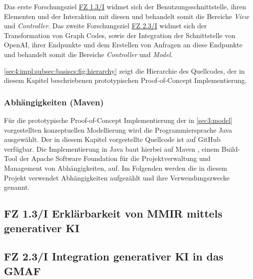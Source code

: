 Das erste Forschungsziel \hyperref[sec4:impl:subsec:fz-explainability]{FZ 1.3/I} widmet sich der Benutzungsschnittstelle, ihren Elementen und der Interaktion mit diesen und behandelt somit die Bereiche \textit{View} und \textit{Controller}.
Das zweite Forschungsziel \hyperref[sec4:impl:subsec:fz-integration]{FZ 2.3/I} widmet sich der Transformation von Graph Codes, sowie der Integration der Schnittstelle von OpenAI, ihrer Endpunkte und dem Erstellen von Anfragen an diese Endpunkte und behandelt somit die Bereiche \textit{Controller} und \textit{Model}.

\cref{sec4:impl:subsec:basiscs:fig:hierarchy} zeigt die Hierarchie des Quellcodes, der in diesem Kapitel beschriebenen prototypischen Proof-of-Concept Implementierung.



\subsubsection{Abhängigkeiten (Maven)}
Für die prototypische Proof-of-Concept Implementierung der in \cref{sec3:model} vorgestellten konzeptuellen Modellierung wird die Programmiersprache Java \cite{java} ausgewählt.
Der in diesem Kapitel vorgestellte Quellcode ist auf GitHub verfügbar.
Die Implementierung in Java baut hierbei auf Maven \cite{maven}, einem Build-Tool der Apache Software Foundation für die Projektverwaltung und Management von Abhängigkeiten, auf.
Im Folgenden werden die in diesem Projekt verwendet Abhängigkeiten aufgezählt und ihre Verwendungszwecke genannt.



\clearpage

\subsection[FZ 1.3/I Erklärbarkeit von MMIR mittels generativer KI]{\texorpdfstring{FZ 1.3/I Erklärbarkeit von MMIR mittels \\ generativer KI}{FZ 1.3/I Erklärbarkeit von MMIR mittels generativer KI}}
\label{sec4:impl:subsec:fz-explainability}



\clearpage

\subsection{FZ 2.3/I Integration generativer KI in das GMAF}
\label{sec4:impl:subsec:fz-integration}

